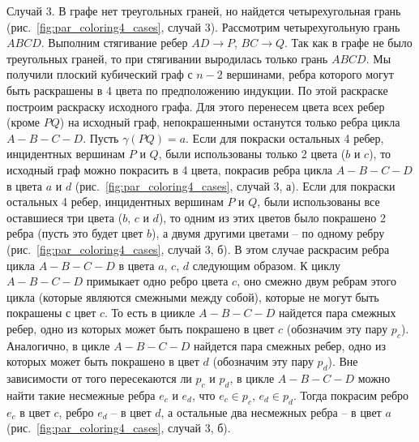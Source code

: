 Случай 3. В графе нет треугольных граней, но найдется четырехугольная грань (рис.~\ref{fig:par_coloring4_cases}, случай 3).
Рассмотрим четырехугольную грань $ABCD$.
Выполним стягивание ребер $AD \rightarrow P$, $BC \rightarrow Q$.
Так как в графе не было треугольных граней, то при стягивании выродилась только грань $ABCD$.
Мы получили плоский кубический граф с $n - 2$ вершинами, ребра которого могут быть раскрашены в 4 цвета по предположению индукции.
По этой раскраске построим раскраску исходного графа.
Для этого перенесем цвета всех ребер (кроме $PQ$) на исходный граф, непокрашенными останутся только ребра цикла $A-B-C-D$.
Пусть $\gamma(PQ) = a$.
Если для покраски остальных 4 ребер, инцидентных вершинам $P$ и $Q$, были использованы только 2 цвета ($b$ и $c$), то исходный граф можно покрасить в 4 цвета, покрасив ребра цикла $A-B-C-D$ в цвета $a$ и $d$ (рис.~\ref{fig:par_coloring4_cases}, случай 3, а).
Если для покраски остальных 4 ребер, инцидентных вершинам $P$ и $Q$, были использованы все оставшиеся три цвета ($b$, $c$ и $d$), то одним из этих цветов было покрашено 2 ребра (пусть это будет цвет $b$), а двумя другими цветами -- по одному ребру (рис.~\ref{fig:par_coloring4_cases}, случай 3, б).
В этом случае раскрасим ребра цикла $A-B-C-D$ в цвета $a$, $c$, $d$ следующим образом.
К циклу $A-B-C-D$ примыкает одно ребро цвета $c$, оно смежно двум ребрам этого цикла (которые являются смежными между собой), которые не могут быть покрашены с цвет $c$.
То есть в циикле $A-B-C-D$ найдется пара смежных ребер, одно из которых может быть покрашено в цвет $c$ (обозначим эту пару $p_c$).
Аналогично, в цикле $A-B-C-D$ найдется пара смежных ребер, одно из которых может быть покрашено в цвет $d$ (обозначим эту пару $p_d$).
Вне зависимости от того пересекаются ли $p_c$ и $p_d$, в цикле $A-B-C-D$ можно найти такие несмежные ребра $e_c$ и $e_d$, что $e_c \in p_c$, $e_d \in p_d$.
Тогда покрасим ребро $e_c$ в цвет $c$, ребро $e_d$ -- в цвет $d$, а остальные два несмежных ребра -- в цвет $a$ (рис.~\ref{fig:par_coloring4_cases}, случай 3, б).


